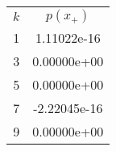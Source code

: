 \begin{tabular}{cc}
\hline
 $k$ & $p(x_+)$ \\
1 &1.11022e-16\\
3 &0.00000e+00\\
5 &0.00000e+00\\
7 &-2.22045e-16\\
9 &0.00000e+00\\
\hline
\end{tabular}
